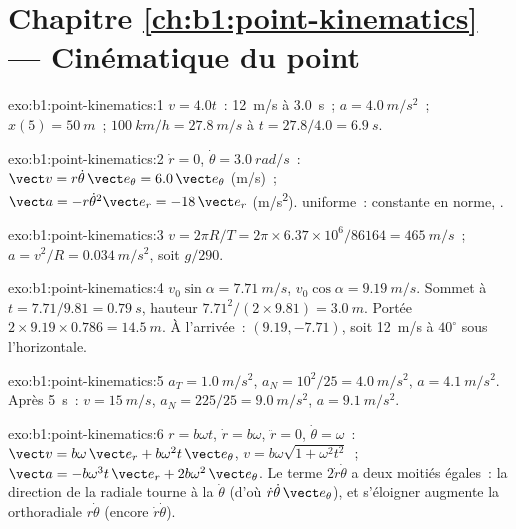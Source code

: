 \section*{Chapitre \ref{ch:b1:point-kinematics} --- Cinématique du point}

\begin{solution}{exo:b1:point-kinematics:1}
$v = 4.0t$~: \qty{12}{m/s} à \qty{3.0}{s}~; $a = \qty{4.0}{m/s^2}$~;
$x(5) = \qty{50}{m}$~; $\qty{100}{km/h} = \qty{27.8}{m/s}$ à $t = 27.8/4.0
= \qty{6.9}{s}$.
\end{solution}

\begin{solution}{exo:b1:point-kinematics:2}
$\dot r = 0$, $\dot\theta = \qty{3.0}{rad/s}$~: $\vect v = r\dot\theta\,\vect e_\theta
= 6.0\,\vect e_\theta$ (\unit{m/s})~; $\vect a = -r\dot\theta^2\vect e_r =
-18\,\vect e_r$ (\unit{m/s^2}).  uniforme~: 
constante en norme, .
\end{solution}

\begin{solution}{exo:b1:point-kinematics:3}
$v = 2\pi R/T = 2\pi \times 6.37\times10^6/86164 = \qty{465}{m/s}$~;
$a = v^2/R = \qty{0.034}{m/s^2}$, soit $g/290$.
\end{solution}

\begin{solution}{exo:b1:point-kinematics:4}
$v_0\sin\alpha = \qty{7.71}{m/s}$, $v_0\cos\alpha = \qty{9.19}{m/s}$.
Sommet à $t = 7.71/9.81 = \qty{0.79}{s}$, hauteur $7.71^2/(2 \times 9.81) =
\qty{3.0}{m}$. Portée $2 \times 9.19 \times 0.786 = \qty{14.5}{m}$.
À l'arrivée~: $(9.19, -7.71)$, soit \qty{12}{m/s} à $40^\circ$ sous
l'horizontale.
\end{solution}

\begin{solution}{exo:b1:point-kinematics:5}
$a_T = \qty{1.0}{m/s^2}$, $a_N = 10^2/25 = \qty{4.0}{m/s^2}$, $a =
\qty{4.1}{m/s^2}$. Après \qty{5}{s}~: $v = \qty{15}{m/s}$, $a_N = 225/25 =
\qty{9.0}{m/s^2}$, $a = \qty{9.1}{m/s^2}$.
\end{solution}

\begin{solution}{exo:b1:point-kinematics:6}
$r = b\omega t$, $\dot r = b\omega$, $\ddot r = 0$, $\dot\theta = \omega$~:
$\vect v = b\omega\,\vect e_r + b\omega^2 t\,\vect e_\theta$, $v = b\omega
\sqrt{1 + \omega^2t^2}$~; $\vect a = -b\omega^3 t\,\vect e_r + 2b\omega^2\,
\vect e_\theta$. Le terme $2\dot r\dot\theta$ a deux moitiés égales~: la
direction de la  radiale tourne à la  $\dot\theta$ (d'où
$\dot r\dot\theta\,\vect e_\theta$), et s'éloigner augmente la 
orthoradiale $r\dot\theta$ (encore $\dot r\dot\theta$).
\end{solution}

